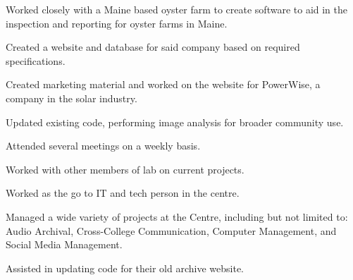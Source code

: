 \documentclass[letterpaper]{deedy-resume} %
\begin{document}
\begin{minipage}[t]{0.66\textwidth}
\sectionspace %



\vspace{\topsep} %
\begin{tightitemize}
\item Worked closely with a Maine based oyster farm to create software to aid in the inspection and reporting for oyster farms in Maine.
\item Created a website and database for said company based on required specifications.
\item Created marketing material and worked on the website for PowerWise, a company in the solar industry.
\end{tightitemize}

\sectionspace %



\begin{tightitemize}
\item Updated existing code, performing image analysis for broader community use.
\item Attended several meetings on a weekly basis.
\item Worked with other members of lab on current projects.
\end{tightitemize}

\sectionspace %




\begin{tightitemize}
\item Worked as the go to IT and tech person in the centre.
\item Managed a wide variety of projects at the Centre, including but not limited to: Audio Archival, Cross-College Communication, Computer Management, and Social Media Management.
\item Assisted in updating code for their old archive website.
\end{tightitemize}


\end{minipage}
\end{document}
